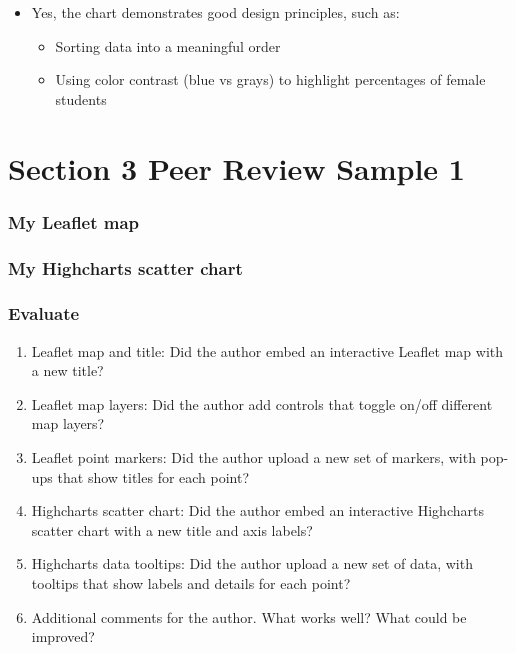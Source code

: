 \documentclass[
  english,
]{book}
\providecommand{\tightlist}{%
  \setlength{\itemsep}{0pt}\setlength{\parskip}{0pt}}
\begin{document}
\begin{itemize}
\tightlist
\item
  Yes, the chart demonstrates good design principles, such as:

  \begin{itemize}
  \tightlist
  \item
    Sorting data into a meaningful order
  \item
    Using color contrast (blue vs grays) to highlight percentages of female students
  \end{itemize}
\end{itemize}

\hypertarget{peer-3-sample-1}{%
\section{Section 3 Peer Review Sample 1}\label{peer-3-sample-1}}

\hypertarget{my-leaflet-map}{%
\subsubsection{My Leaflet map}\label{my-leaflet-map}}

\hypertarget{my-highcharts-scatter-chart}{%
\subsubsection{My Highcharts scatter chart}\label{my-highcharts-scatter-chart}}

\hypertarget{evaluate-4}{%
\subsubsection{Evaluate}\label{evaluate-4}}

\begin{enumerate}
\def\labelenumi{\arabic{enumi}.}
\tightlist
\item
  Leaflet map and title: Did the author embed an interactive Leaflet map with a new title?
\item
  Leaflet map layers: Did the author add controls that toggle on/off different map layers?
\item
  Leaflet point markers: Did the author upload a new set of markers, with pop-ups that show titles for each point?
\item
  Highcharts scatter chart: Did the author embed an interactive Highcharts scatter chart with a new title and axis labels?
\item
  Highcharts data tooltips: Did the author upload a new set of data, with tooltips that show labels and details for each point?
\item
  Additional comments for the author. What works well? What could be improved?
\end{enumerate}
\end{document}
